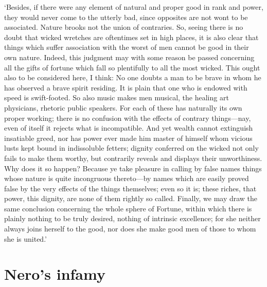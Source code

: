 \documentclass[11pt]{book}
\begin{document}
`Besides, if there were any element of natural and proper good in rank
and power, they would never come to the utterly bad, since opposites are
not wont to be associated. Nature brooks not the union of contraries.
So, seeing there is no doubt that wicked wretches are oftentimes set in
high places, it is also clear that things which suffer association with
the worst of men cannot be good in their own nature. Indeed, this
judgment may with some reason be passed concerning all the gifts of
fortune which fall so plentifully to all the most wicked. This ought
also to be considered here, I think: No one doubts a man to be brave in
whom he has observed a brave spirit residing. It is plain that one who
is endowed with speed is swift-footed. So also music makes men musical,
the healing art physicians, rhetoric public speakers. For each of these
has naturally its own proper working; there is no confusion with the
effects of contrary things---nay, even of itself it rejects what is
incompatible. And yet wealth cannot extinguish insatiable greed, nor has
power ever made him master of himself whom vicious lusts kept bound in
indissoluble fetters; dignity conferred on the wicked not only fails to
make them worthy, but contrarily reveals and displays their
unworthiness. Why does it so happen? Because ye take pleasure in calling
by false names things whose nature is quite incongruous thereto---by
names which are easily proved false by the very effects of the things
themselves; even so it is; these riches, that power, this dignity, are
none of them rightly so called. Finally, we may draw the same conclusion
concerning the whole sphere of Fortune, within which there is plainly
nothing to be truly desired, nothing of intrinsic excellence; for she
neither always joins herself to the good, nor does she make good men of
those to whom she is united.'




\section{Nero's infamy}
\end{document}
